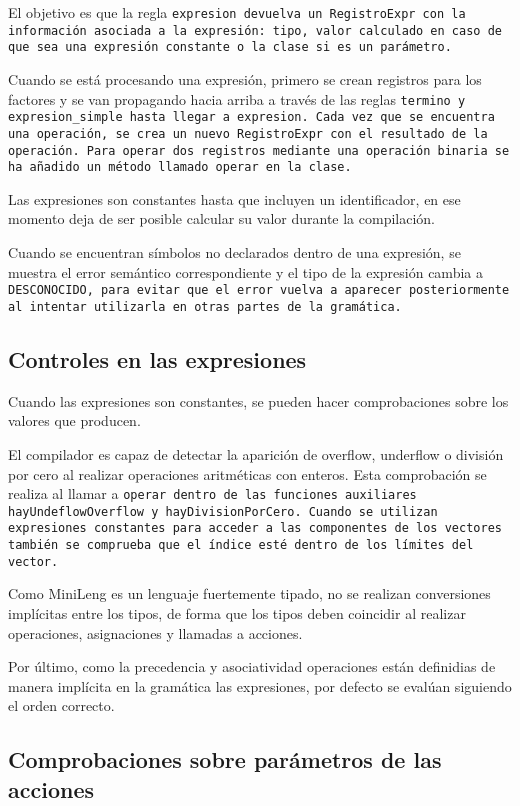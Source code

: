 El objetivo es que la regla \tt{expresion} devuelva un \tt{RegistroExpr} con la información asociada a la expresión: tipo, valor calculado en caso de que sea una expresión constante o la clase si es un parámetro.

Cuando se está procesando una expresión, primero se crean registros para los factores y se van propagando hacia arriba a través de las reglas \tt{termino} y \tt{expresion\_simple} hasta llegar a \tt{expresion}. Cada vez que se encuentra una operación, se crea un nuevo \tt{RegistroExpr} con el resultado de la operación. Para operar dos registros mediante una operación binaria se ha añadido un método llamado \tt{operar} en la clase.

Las expresiones son constantes hasta que incluyen un identificador, en ese momento deja de ser posible calcular su valor durante la compilación.

Cuando se encuentran símbolos no declarados dentro de una expresión, se muestra el error semántico correspondiente y el tipo de la expresión cambia a \tt{DESCONOCIDO}, para evitar que el error vuelva a aparecer posteriormente al intentar utilizarla en otras partes de la gramática.


\subsection{Controles en las expresiones}
Cuando las expresiones son constantes, se pueden hacer comprobaciones sobre los valores que producen.

El compilador es capaz de detectar la aparición de overflow, underflow o división por cero al realizar operaciones aritméticas con enteros. Esta comprobación se realiza al llamar a \tt{operar} dentro de las funciones auxiliares \tt{hayUndeflowOverflow} y \tt{hayDivisionPorCero}. Cuando se utilizan expresiones constantes para acceder a las componentes de los vectores también se comprueba que el índice esté dentro de los límites del vector.

Como MiniLeng es un lenguaje fuertemente tipado, no se realizan conversiones implícitas entre los tipos, de forma que los tipos deben coincidir al realizar operaciones, asignaciones y llamadas a acciones.

Por último, como la precedencia y asociatividad operaciones están definidias de manera implícita en la gramática las expresiones, por defecto se evalúan siguiendo el orden correcto.

\subsection{Comprobaciones sobre parámetros de las acciones}

